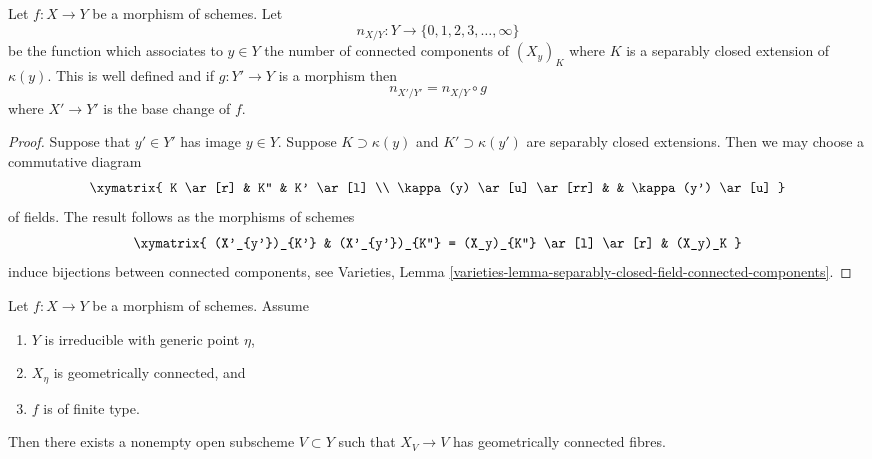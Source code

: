 \begin{lemma}
\label{lemma-base-change-fibres-nr-geometrically-connected-components}
Let $f : X \to Y$ be a morphism of schemes. Let
$$
n_{X/Y} : Y \to \{0, 1, 2, 3, \ldots, \infty\}
$$
be the function which associates to $y \in Y$ the number of connected
components of $(X_y)_K$ where $K$ is a separably closed extension
of $\kappa(y)$. This is well defined and if $g : Y' \to Y$ is a morphism
then
$$
n_{X'/Y'} = n_{X/Y} \circ g
$$
where $X' \to Y'$ is the base change of $f$.
\end{lemma}

\begin{proof}
Suppose that $y' \in Y'$ has image $y \in Y$.
Suppose $K \supset \kappa(y)$ and $K' \supset \kappa(y')$ are separably
closed extensions. Then we may choose a commutative diagram
$$
\xymatrix{
K \ar[r] & K'' & K' \ar[l] \\
\kappa(y) \ar[u] \ar[rr] & & \kappa(y') \ar[u]
}
$$
of fields. The result follows as the morphisms of schemes
$$
\xymatrix{
(X'_{y'})_{K'} &
(X'_{y'})_{K''} = (X_y)_{K''} \ar[l] \ar[r] &
(X_y)_K
}
$$
induce bijections between connected components, see
Varieties,
Lemma \ref{varieties-lemma-separably-closed-field-connected-components}.
\end{proof}

\begin{lemma}
\label{lemma-geometrically-connected-generic-fibre}
Let $f : X \to Y$ be a morphism of schemes.
Assume
\begin{enumerate}
\item $Y$ is irreducible with generic point $\eta$,
\item $X_\eta$ is geometrically connected, and
\item $f$ is of finite type.
\end{enumerate}
Then there exists a nonempty open subscheme $V \subset Y$
such that $X_V \to V$ has geometrically connected fibres.
\end{lemma}

